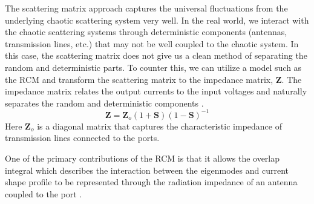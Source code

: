 The scattering matrix approach captures the universal fluctuations from the underlying chaotic scattering system very well. In the real world, we interact with the chaotic scattering systems through deterministic components (antennas, transmission lines, etc.) that may not be well coupled to the chaotic system. In this case, the scattering matrix does not give us a clean method of separating the random and deterministic parts. To counter this, we can utilize a model such as the RCM and transform the scattering matrix to the impedance matrix, $\textbf{Z}$. The impedance matrix relates the output currents to the input voltages \cite{yeh_first_principles} and naturally separates the random and deterministic components \cite{zheng_single}. 
\begin{equation}
\textbf{Z} = \textbf{Z}_o(1+\textbf{S})(1-\textbf{S})^{-1}
\label{rmt_eq:3}
\end{equation}
\renewcommand{\baselinestretch}{2} \small\normalsize
Here $\textbf{Z}_o$ is a diagonal matrix that captures the characteristic impedance of transmission lines connected to the ports.

One of the primary contributions of the RCM is that it allows the overlap integral which describes the interaction between the eigenmodes and current shape profile to be represented through the radiation impedance of an antenna coupled to the port \cite{hart_time_domain} \cite{zheng_single}.